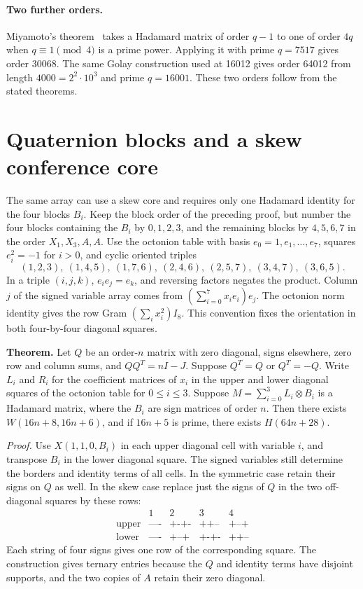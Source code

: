 \documentclass[10pt]{article}
\begin{document}
\paragraph{Two further orders.}
Miyamoto's theorem~\cite{miyamoto} takes a Hadamard matrix of order $q-1$ to one of order $4q$ when $q\equiv1\pmod4$ is a prime power. Applying it with prime $q=7517$ gives order 30068. The same Golay construction used at 16012 gives order 64012 from length $4000=2^2\cdot10^3$ and prime $q=16001$. These two orders follow from the stated theorems.

\section{Quaternion blocks and a skew conference core}
\label{sec:quaternion}

The same array can use a skew core and requires only one Hadamard identity for the four blocks $B_i$. Keep the block order of the preceding proof, but number the four blocks containing the $B_i$ by $0,1,2,3$, and the remaining blocks by $4,5,6,7$ in the order $X_1,X_3,A,A$. Use the octonion table with basis $e_0=1,e_1,\ldots,e_7$, squares $e_i^2=-1$ for $i>0$, and cyclic oriented triples
\[
 (1,2,3),\ (1,4,5),\ (1,7,6),\ (2,4,6),\ (2,5,7),\ (3,4,7),\ (3,6,5).
\]
In a triple $(i,j,k)$, $e_i e_j=e_k$, and reversing factors negates the product. Column $j$ of the signed variable array comes from $(\sum_{i=0}^7 x_i e_i)e_j$. The octonion norm identity gives the row Gram $(\sum_i x_i^2)I_8$. This convention fixes the orientation in both four-by-four diagonal squares.

\medskip
\noindent\textbf{Theorem.}
Let $Q$ be an order-$n$ matrix with zero diagonal, signs elsewhere, zero row and column sums, and $QQ^T=nI-J$. Suppose $Q^T=Q$ or $Q^T=-Q$. Write $L_i$ and $R_i$ for the coefficient matrices of $x_i$ in the upper and lower diagonal squares of the octonion table for $0\le i\le3$. Suppose $M=\sum_{i=0}^3 L_i\otimes B_i$ is a Hadamard matrix, where the $B_i$ are sign matrices of order $n$. Then there exists $W(16n+8,16n+6)$, and if $16n+5$ is prime, there exists $H(64n+28)$.

\medskip
\noindent\textit{Proof.}
Use $X(1,1,0,B_i)$ in each upper diagonal cell with variable $i$, and transpose $B_i$ in the lower diagonal square. The signed variables still determine the borders and identity terms of all cells. In the symmetric case retain their signs on $Q$ as well. In the skew case replace just the signs of $Q$ in the two off-diagonal squares by these rows:
\[
\begin{array}{c|rrrr}
 & 1 & 2 & 3 & 4\\
\text{upper} & \texttt{----} & \texttt{+-+-} & \texttt{++--} & \texttt{+--+}\\
\text{lower} & \texttt{----} & \texttt{+--+} & \texttt{+-+-} & \texttt{++--}
\end{array}
\]
Each string of four signs gives one row of the corresponding square. The construction gives ternary entries because the $Q$ and identity terms have disjoint supports, and the two copies of $A$ retain their zero diagonal.
\end{document}
